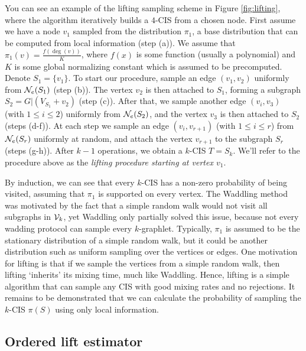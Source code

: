     You can see an example of the lifting sampling scheme in Figure \ref{fig:lifting}, where the algorithm iteratively builds a $4$-CIS from a chosen node.
	First assume we have a node $v_1$ sampled from the distribution $\pi_1$, a base distribution that can be computed from local information (step (a)). 
	We assume that $\pi_1(v) = \frac{f(\deg(v))}{K}$, where $f(x)$ is some function (usually a polynomial) and $K$ is some global normalizing constant which is assumed to be precomputed.
	Denote $S_1 = \{v_1\}$.
    To start our procedure, sample an edge $(v_1,v_2)$ uniformly from $\mathcal{N}_e(S_1)$ (step (b)). 
	The vertex $v_2$ is then attached to $S_1$, forming a subgraph $S_2 = G|(V_{S_1} + {v_2})$ (step (c)).
	After that, we sample another edge $(v_i, v_3)$ (with $1\leq i\leq 2$) uniformly from $\mathcal{N}_e(S_2)$, and the vertex $v_3$ is then attached to $S_2$ (steps (d-f)).
	At each step we sample an edge $(v_i, v_{r+1})$ (with $1\leq i \leq r$) from $\mathcal{N}_e(S_r)$ uniformly at random, and attach the vertex $v_{r+1}$ to the subgraph $S_r$ (steps (g-h)).
	After $k-1$ operations, we obtain a $k$-CIS $T = S_k$.
	We'll refer to the procedure above as the {\em lifting procedure starting at vertex $v_1$}.

    By induction, we can see that every $k$-CIS has a non-zero probability of being visited, assuming that $\pi_1$ is supported on every vertex.
	The Waddling method was motivated by the fact that a simple random walk would not visit all subgraphs in $\mathcal{V}_k$, yet Waddling only partially solved this issue, because not every wadding protocol can sample every $k$-graphlet.
    Typically, $\pi_1$ is assumed to be the stationary distribution of a simple random walk, but it could be another distribution such as uniform sampling over the vertices or edges.
	One motivation for lifting is that if we sample the vertices from a simple random walk, then lifting `inherits' its mixing time, much like Waddling.
	Hence, lifting is a simple algorithm that can sample any CIS with good mixing rates and no rejections.
	It remains to be demonstrated that we can calculate the probability of sampling the $k$-CIS $\pi(S)$ using only local information.
	
	\subsection{Ordered lift estimator}
	
